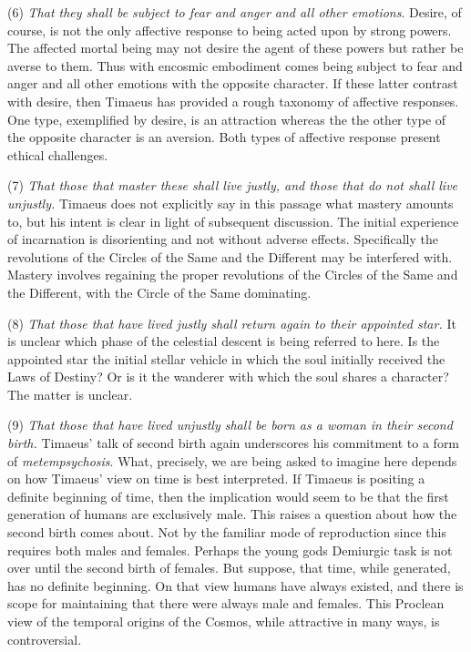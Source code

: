 (6) \emph{That they shall be subject to fear and anger and all other emotions}. Desire, of course, is not the only affective response to being acted upon by strong powers. The affected mortal being may not desire the agent of these powers but rather be averse to them. Thus with encosmic embodiment comes being subject to fear and anger and all other emotions with the opposite character. If these latter contrast with desire, then Timaeus has provided a rough taxonomy of affective responses. One type, exemplified by desire, is an attraction whereas the the other type of the opposite character is an aversion. Both types of affective response present ethical challenges.

(7) \emph{That those that master these shall live justly, and those that do not shall live unjustly.} Timaeus does not explicitly say in this passage what mastery amounts to, but his intent is clear in light of subsequent discussion. The initial experience of incarnation is disorienting and not without adverse effects. Specifically the revolutions of the Circles of the Same and the Different may be interfered with. Mastery involves regaining the proper revolutions of the Circles of the Same and the Different, with the Circle of the Same dominating. 

(8) \emph{That those that have lived justly shall return again to their appointed star.} It is unclear which phase of the celestial descent is being referred to here. Is the appointed star the initial stellar vehicle in which the soul initially received the Laws of Destiny? Or is it the wanderer with which the soul shares a character? The matter is unclear.

(9) \emph{That those that have lived unjustly shall be born as a woman in their second birth.} Timaeus' talk of second birth again underscores his commitment to a form of \emph{metempsychosis}. What, precisely, we are being asked to imagine here depends on how Timaeus' view on time is best interpreted. If Timaeus is positing a definite beginning of time, then the implication would seem to be that the first generation of humans are exclusively male. This raises a question about how the second birth comes about. Not by the familiar mode of reproduction since this requires both males and females. Perhaps the young gods Demiurgic task is not over until the second birth of females. But suppose, that time, while generated, has no definite beginning. On that view humans have always existed, and there is scope for maintaining that there were always male and females. This Proclean view of the temporal origins of the Cosmos, while attractive in many ways, is controversial.

